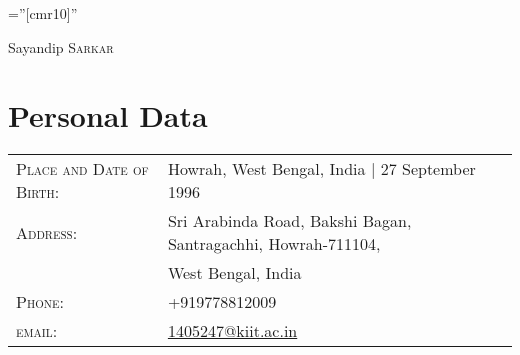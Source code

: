 \documentclass[a4paper,10pt]{article}
\begin{document}

\pagestyle{empty} %

\font\fb=''[cmr10]'' %

\par{\centering
		{\Huge Sayandip \textsc{Sarkar}
	}\bigskip\par}

\section{Personal Data}

\begin{tabular}{ll}
    \textsc{Place and Date of Birth:} & Howrah, West Bengal, India  | 27 September 1996 \\
    \textsc{Address:}   & Sri Arabinda Road, Bakshi Bagan, Santragachhi, Howrah-711104,\\& West Bengal, India \\
    \textsc{Phone:}     & +919778812009\\
    \textsc{email:}     & \href{mailto:1405247@kiit.ac.in}{1405247@kiit.ac.in}
\end{tabular}

\end{document}
